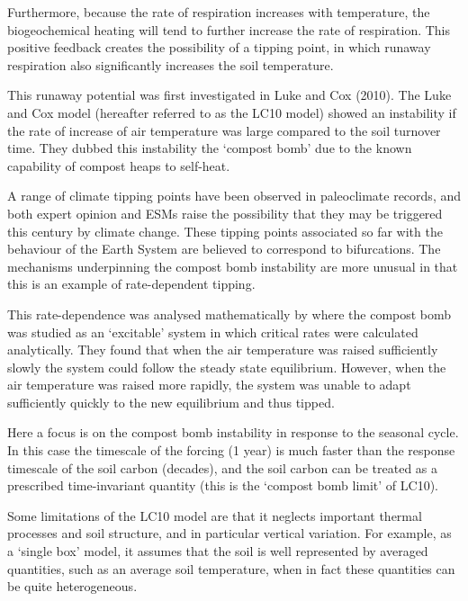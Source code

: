 Furthermore, because the rate of respiration increases with temperature, the biogeochemical heating will tend to
further increase the rate of respiration. This positive feedback creates the possibility of a tipping point, in which
runaway respiration also significantly increases the soil temperature.

This runaway potential was first investigated in Luke and Cox (2010)\cite{Luke2011}. The Luke and Cox model (hereafter referred to as the LC10 model)
showed an instability if the rate of increase of air temperature was large compared to the soil turnover time. They dubbed this instability
the `compost bomb' due to the known capability of compost heaps to self-heat\cite{Nelson2007,Sidhu2007,Browne1929}.

A range of climate tipping points have been observed in
paleoclimate records\cite{Alley2003}, and both expert opinion\cite{Lenton2008} and ESMs\cite{Drijfhout2015} raise the possibility that they may be triggered this century by climate change.
These tipping points associated so far with the behaviour of the Earth System are believed to
correspond to bifurcations. The mechanisms underpinning the compost bomb instability are more unusual in that this is an example of rate-dependent tipping\cite{Ashwin2012}.

This rate-dependence was analysed mathematically
by \cite{Wieczorek2011} where the compost bomb was studied as an `excitable' system in which critical rates
were calculated analytically. They found that when the air temperature was
raised sufficiently slowly the system could follow the steady state equilibrium. However, when the air temperature was raised more rapidly,
the system was unable to adapt sufficiently quickly to the new equilibrium and thus tipped.

Here a focus is on the compost bomb instability in response to the seasonal cycle. In this case the timescale of the forcing (1 year) is much faster than the response timescale of the soil carbon
(decades), and the soil carbon can be treated as a prescribed time-invariant quantity (this is the `compost bomb limit' of LC10). 

Some limitations of the LC10 model are that it neglects important thermal processes and soil structure, and in particular vertical variation.
For example, as a `single box' model, it assumes that the soil is well represented by averaged quantities, such as an average soil temperature,
when in fact these quantities can be quite heterogeneous\cite{Gedney2003}.


